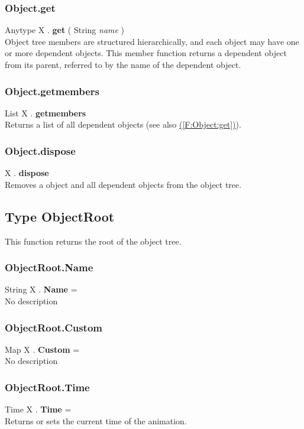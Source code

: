 \documentclass[10pt]{book}
\newcommand{\linkitem}[1]{\hyperref[#1]{\nameref{#1} (\ref{#1})}}
\begin{document}
\subsubsection{Object.get \label{F:Object:get}}
Anytype X . \textbf{get} ( String \textit{name} ) \\
Object tree members are structured hierarchically, and each object may have one or more dependent objects. This member function returns a dependent object from its parent, referred to by the name of the dependent object.

\subsubsection{Object.getmembers \label{F:Object:getmembers}}
List X . \textbf{getmembers} \\
Returns a list of all dependent objects (see also \linkitem{F:Object:get}).

\subsubsection{Object.dispose \label{F:Object:dispose}}
X . \textbf{dispose} \\
Removes a object and all dependent objects from the object tree.

\subsection{Type ObjectRoot \label{T:ObjectRoot}}
This function returns the root of the object tree.

\subsubsection{ObjectRoot.Name \label{F:ObjectRoot:Name}}
String X . \textbf{Name} = \\
No description

\subsubsection{ObjectRoot.Custom \label{F:ObjectRoot:Custom}}
Map X . \textbf{Custom} = \\
No description

\subsubsection{ObjectRoot.Time \label{F:ObjectRoot:Time}}
Time X . \textbf{Time} = \\
Returns or sets the current time of the animation.
\end{document}
